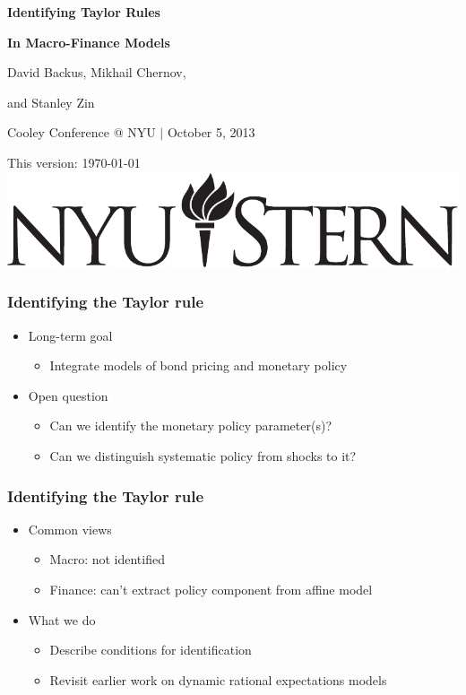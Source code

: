 \documentclass{beamer}
\title[Identifying Taylor Rules]{}
\author[Backus, Chernov, \& Zin]{}
\institute[NYU, UCLA]{}
\date[]{\today}
\begin{document}
\vspace*{0.65in}
\centerline{\Large\bf Identifying Taylor Rules}
\vspace*{0.05in}
\centerline{\Large\bf In Macro-Finance Models}

\bigskip\bigskip\bigskip\medskip
\centerline{David Backus, Mikhail Chernov,}
\centerline{and Stanley Zin}

\bigskip\medskip\medskip\medskip
\centerline{Cooley Conference @ NYU $|$ October 5, 2013}

\vfill
{\tiny \hspace{7pt}This version: \today}
{\hfill \includegraphics[scale=0.25]{stern_logo3.pdf}}

\begin{frame}
\frametitle{Identifying the Taylor rule}
\begin{itemize} %
\item Long-term goal
\begin{itemize}
\item Integrate models of bond pricing and monetary policy
\end{itemize}
\item Open question
\begin{itemize}
\item Can we identify the monetary policy parameter(s)?
\item Can we distinguish systematic policy from shocks to it?
\end{itemize}
\end{itemize}
\end{frame}

\begin{frame}
\frametitle{Identifying the Taylor rule}
\begin{itemize}
\item Common views
\begin{itemize}
\item Macro: not identified
\item Finance: can't extract policy component from affine model
\end{itemize}
\item What we do
\begin{itemize}
\item Describe conditions for identification
\item Revisit earlier work on dynamic rational expectations models
\end{itemize}
\end{itemize}
\end{frame}
\end{document}
